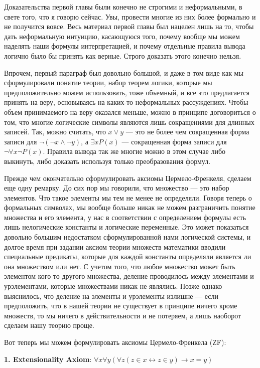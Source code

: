 Доказательства первой главы были конечно не строгими и неформальными, в свете того, что я говорю сейчас. Увы, провести многие из них более формально и не получится вовсе. Весь материал первой главы был нацелен лишь на то, чтобы дать неформальную интуицию, касающуюся того, почему вообще мы можем наделять наши формулы интерпретацией, и почему отдельные правила вывода логично было бы принять как верные. Строго доказать этого конечно нельзя.

Впрочем, первый параграф был довольно большой, и даже в том виде как мы сформулировали понятие теории, набор теорем логики, которые мы предположительно можем использовать, тоже объемный, и все это предлагается принять на веру, основываясь на каких-то неформальных рассуждениях. Чтобы объем принимаемого на веру оказался меньше, можно в принципе договориться о том, что многие логические символы являются лишь сокращениями для длинных записей. Так, можно считать, что $x\vee y$ — это не более чем сокращенная форма записи для $\neg (\neg x \wedge \neg y)$, а $\exists x P(x)$ — сокращенная форма записи для $\neg \forall x \neg P(x)$. Правила вывода так же многие можно в этом случае либо выкинуть, либо доказать используя только преобразования формул.

Прежде чем окончательно сформулировать аксиомы Цермело-Френкеля, сделаем еще одну ремарку. До сих пор мы говорили, что множество — это набор элементов. Что такое элементы мы тем не менее не определяли. Говоря теперь о формальных символах, мы вообще больше никак не можем разграничить понятие множества и его элемента, у нас в соответствии с определением формулы есть лишь нелогические константы и логические переменные. Это может показаться довольно большим недостатком сформулированной нами логической системы, и долгое время при задании аксиом теории множеств математики вводили специальные предикаты, которые для каждой константы определяли является ли она множеством или нет. С учетом того, что любое множество может быть элементом кого-то другого множества, деление проводилось между элементами и урэлементами, которые множествами никак не являлись. Позже однако выяснилось, что деление на элементы и урэлементы излишне — если предположить, что в нашей теории не существует в принципе ничего кроме множеств, то мы ничего в действительности и не потеряем, а лишь наоборот сделаем нашу теорию проще.

Вот теперь мы можем формулировать аксиомы Цермело-Френкела (ZF):

{\bfseries 1. Extensionality Axiom}: $\forall x \forall y (\forall z (z \in x \leftrightarrow z \in y) \rightarrow x = y)$

